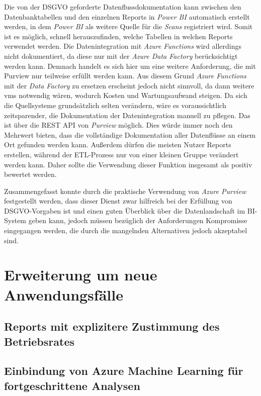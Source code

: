 Die von der DSGVO geforderte Datenflussdokumentation kann zwischen den Datenbanktabellen und den einzelnen Reports in \textit{Power BI} automatisch erstellt werden, in dem \textit{Power BI} als weitere Quelle für die \textit{Scans} registriert wird. Somit ist es möglich, schnell herauszufinden, welche Tabellen in welchen Reports verwendet werden. Die Datenintegration mit \textit{Azure Functions} wird allerdings nicht dokumentiert, da diese nur mit der \textit{Azure Data Factory} berücksichtigt werden kann. Demnach handelt es sich hier um eine weitere Anforderung, die mit Purview nur teilweise erfüllt werden kann. Aus diesem Grund \textit{Azure Functions} mit der \textit{Data Factory} zu ersetzen erscheint jedoch nicht sinnvoll, da dann weitere \acp{vm} notwendig wären, wodurch Kosten und Wartungsaufwand steigen. Da sich die Quellsysteme grundsätzlich selten verändern, wäre es voraussichtlich zeitsparender, die Dokumentation der Datenintegration manuell zu pflegen. Das ist über die REST API von \textit{Purview} möglich. Dies würde immer noch den Mehrwert bieten, dass die vollständige Dokumentation aller Datenflüsse an einem Ort gefunden werden kann. Außerdem dürfen die meisten Nutzer Reports erstellen, während der ETL-Prozess nur von einer kleinen Gruppe verändert werden kann. Daher sollte die Verwendung dieser Funktion insgesamt als positiv bewertet werden. \cite[vgl.][]{lesteve_definitive_2021, msdoc_22_purview_sensLabel, riscutia_data_2021, borosch_cloud_2021}

Zusammengefasst konnte durch die praktische Verwendung von \textit{Azure Purview} festgestellt werden, dass dieser Dienst zwar hilfreich bei der Erfüllung von DSGVO-Vorgaben ist und einen guten Überblick über die Datenlandschaft im BI-System geben kann, jedoch müssen bezüglich der Anforderungen Kompromisse eingegangen werden, die durch die mangelnden Alternativen jedoch akzeptabel sind.


\section{Erweiterung um neue Anwendungsfälle} \label{sec:praktischeUmsetzung:ausblick}

\subsection{Reports mit explizitere Zustimmung des Betriebsrates}

\subsection{Einbindung von Azure Machine Learning für fortgeschrittene Analysen}